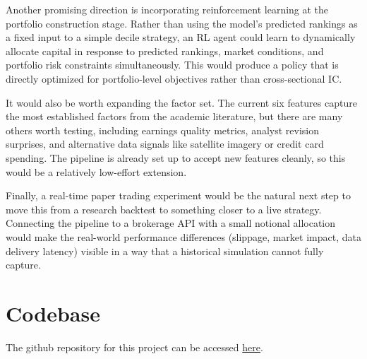 \documentclass[11pt]{article}
\begin{document}
Another promising direction is incorporating reinforcement learning at the portfolio construction stage. Rather than using the model's predicted rankings as a fixed input to a simple decile strategy, an RL agent could learn to dynamically allocate capital in response to predicted rankings, market conditions, and portfolio risk constraints simultaneously. This would produce a policy that is directly optimized for portfolio-level objectives rather than cross-sectional IC.

It would also be worth expanding the factor set. The current six features capture the most established factors from the academic literature, but there are many others worth testing, including earnings quality metrics, analyst revision surprises, and alternative data signals like satellite imagery or credit card spending. The pipeline is already set up to accept new features cleanly, so this would be a relatively low-effort extension.

Finally, a real-time paper trading experiment would be the natural next step to move this from a research backtest to something closer to a live strategy. Connecting the pipeline to a brokerage API with a small notional allocation would make the real-world performance differences (slippage, market impact, data delivery latency) visible in a way that a historical simulation cannot fully capture.

\section{Codebase}
The github repository for this project can be accessed \href{https://github.com/sohamtulsyan/iml-project}{here}.
\end{document}
